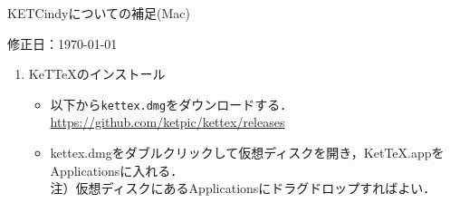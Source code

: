 \documentclass{ujarticle}
\begin{document}
\begin{center}
KETCindyについての補足(Mac)
\end{center}

\hfill 修正日：\today

\begin{enumerate}[\bf\large 1.]

\item KeTTeXのインストール

\begin{itemize}
\item 以下から\verb|kettex.dmg|をダウンロードする．\\
\hspace*{10mm}\url{https://github.com/ketpic/kettex/releases}
\item kettex.dmgをダブルクリックして仮想ディスクを開き，KetTeX.appをApplicationsに入れる．\\
\hspace*{1zw}注）仮想ディスクにあるApplicationsにドラグドロップすればよい．

\end{itemize}


\end{enumerate}
\end{document}
